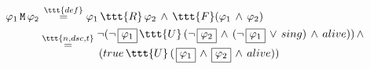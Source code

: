 \documentclass[11pt]{article}
\begin{document}
$\begin{aligned}
      \varphi_1\,\tt{M}\,\varphi_2 &\,\overset{\ttt{def}}{=} \varphi_1\,\ttt{R}\,\varphi_2\,\land\,\ttt{F}(\varphi_1\,\land\,\varphi_2) \\
      &\overset{\ttt{n,dsc,t}}{=} \begin{aligned}
                                       &\neg(\neg\,\boxed{\varphi_1}\,\ttt{U}\,(\neg\,\boxed{\varphi_2}\,\land\,(\neg\,\boxed{\varphi_1}\,\lor\,sing)\,\land\,alive))\,\land\\
                                       &\,(true\,\ttt{U}\,(\,\boxed{\varphi_1}\,\land\,\boxed{\varphi_2}\,\land\,alive))
      \end{aligned}
\end{aligned}$
\end{document}
